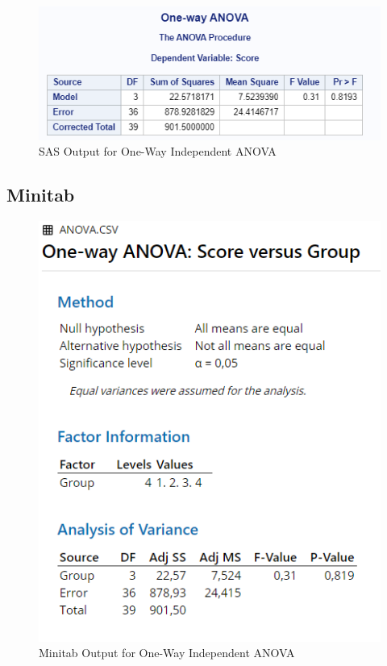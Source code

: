 \documentclass[
]{book}
\begin{document}
\begin{figure}[!h]
\includegraphics{Screenshots/ANOVA/anovaSAS} \caption{\label{fig:anovaSAS}SAS Output for One-Way Independent ANOVA}\label{fig:anovaSAS}
\end{figure}

\hypertarget{minitab}{%
\subsection{Minitab}\label{minitab}}

\begin{figure}[!h]
\includegraphics{Screenshots/ANOVA/anovaMinitab} \caption{\label{fig:anovaMinitab}Minitab Output for One-Way Independent ANOVA}\label{fig:anovaMinitab}
\end{figure}
\end{document}
